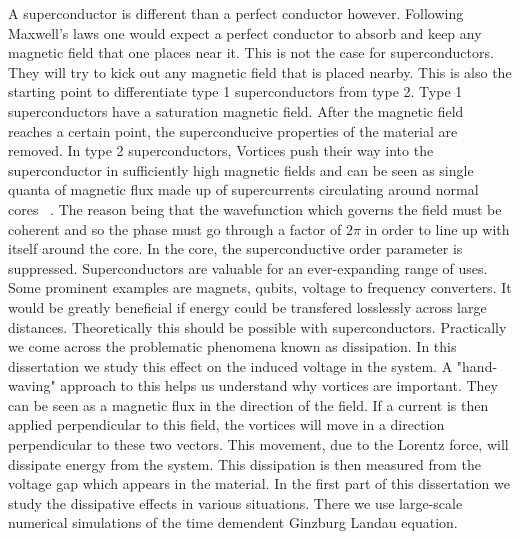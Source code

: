  A superconductor is different than a perfect conductor however. Following Maxwell's laws one would expect a perfect conductor to absorb and keep any magnetic field that one places near it. This is not the case for superconductors. They will try to kick out any magnetic field that is placed nearby. This is also the starting point to differentiate type 1 superconductors from type 2. Type 1 superconductors have a saturation magnetic field. After the magnetic field reaches a certain point, the superconducive properties of the material are removed. In type 2 superconductors, Vortices push their way into the superconductor in sufficiently high magnetic fields and can be seen as single quanta of magnetic flux made up of supercurrents circulating around normal cores ~\cite{Kwok16}. The reason being that the wavefunction which governs the field must be coherent and so the phase must go through a factor of $2\pi$ in order to line up with itself around the core. In the core, the superconductive order parameter is suppressed.  
Superconductors are valuable for an ever-expanding range of uses. Some prominent examples are magnets, qubits, voltage to frequency converters. It would be greatly beneficial if energy could be transfered losslessly across large distances. Theoretically this should be possible with superconductors. Practically we come across the problematic phenomena known as dissipation.  In this dissertation we study this effect on the induced voltage in the system. A "hand-waving" approach to this helps us understand why vortices are important. They can be seen as a magnetic flux in the direction of the field. If a current is then applied perpendicular to this field, the vortices will move in a direction perpendicular to these two vectors. This movement, due to the Lorentz force, will dissipate energy from the system. This dissipation is then measured from the voltage gap which appears in the material. In the first part of this dissertation we study the dissipative effects in various situations. There we use large-scale numerical simulations of the time demendent Ginzburg Landau equation.


